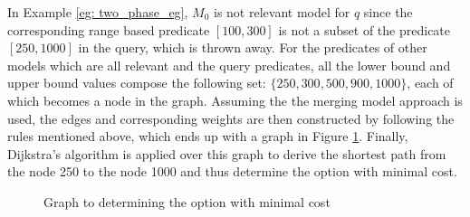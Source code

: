 \begin{example}
In Example \ref{eg: two_phase_eg}, $M_0$ is not relevant model for $q$ since the corresponding range based predicate $[100, 300]$ is not a subset of the predicate $[250, 1000]$ in the query, which is thrown away. For the predicates of other models which are all relevant and the query predicates, all the lower bound and upper bound values compose the following set: $\{250, 300, 500, 900, 1000\}$, each of which becomes a node in the graph. Assuming the the merging model approach is used, the edges and corresponding weights are then constructed by following the rules mentioned above, which ends up with a graph in Figure \ref{fig:min_cost_graph}. Finally, Dijkstra's algorithm is applied over this graph to derive the shortest path from the node 250 to the node 1000 and thus determine the option with minimal cost.

\begin{figure}[t]
\begin{center}
\end{center}
\caption{Graph to determining the option with minimal cost}
\label{fig:min_cost_graph}
\end{figure}

\end{example}

